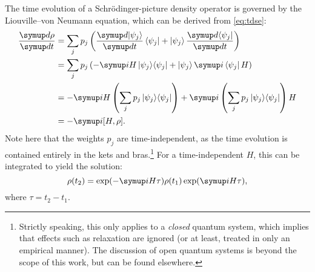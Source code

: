 The time evolution of a Schr\"odinger-picture density operator is governed by the Liouville--von Neumann equation, which can be derived from \cref{eq:tdse}:
\begin{align}
    \label{eq:lvn}
    \frac{\md\rho}{\md t} &= \sum_j p_j \left(\frac{\md\!\ket{\psi_j}}{\md t}\bra{\psi_j} + \ket{\psi_j}\frac{\md\!\bra{\psi_j}}{\md t} \right) \notag \\
                                       &= \sum_j p_j \left(-\mi H\ket{\psi_j}\!\bra{\psi_j} + \ket{\psi_j}\mi\bra{\psi_j}H \right) \notag \\
                                       &= -\mi H \left(\sum_j p_j\ket{\psi_j}\!\bra{\psi_j}\right) + \mi \left(\sum_j p_j \ket{\psi_j}\!\bra{\psi_j}\right) H \notag \\
                                       &= -\mi [H, \rho].
\end{align}
Note here that the weights $p_j$ are time-independent, as the time evolution is contained entirely in the kets and bras.\footnote{Strictly speaking, this only applies to a \textit{closed} quantum system, which implies that effects such as relaxation are ignored (or at least, treated in only an empirical manner). The discussion of open quantum systems is beyond the scope of this work, but can be found elsewhere.\autocite{Breuer2002,Lidar2019arXiv}}
For a time-independent $H$, this can be integrated to yield the solution:
\begin{equation}
    \label{eq:lvn_integrated}
    \rho(t_2) = \exp(-\mi H\tau)\rho(t_1)\exp(\mi H\tau),
\end{equation}
where $\tau = t_2 - t_1$.

